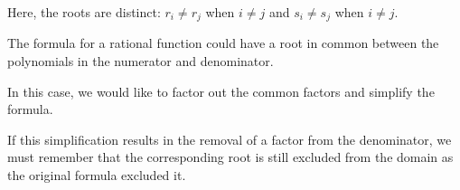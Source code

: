 \documentclass{ximera}
\begin{document}
Here, the roots are distinct:  $r_i \ne r_j$ when $i \ne j$ and $s_i \ne s_j$ when $i \ne j$.



\begin{warning}  

The formula for a rational function could have a root in common between the polynomials in the numerator and denominator.

In this case, we would like to factor out the common factors and simplify the formula.

If this simplification results in the removal of a factor from the denominator, we must remember that the corresponding root is still excluded from the domain as the original formula excluded it.



\end{warning}
\end{document}
